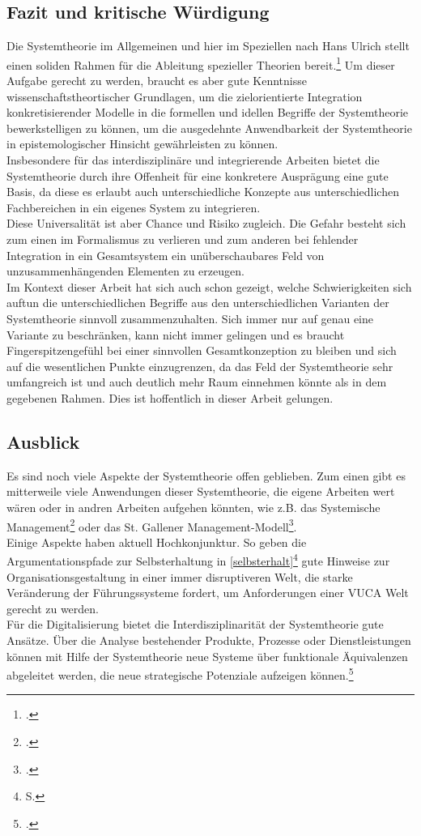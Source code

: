 \documentclass[a4paper,12pt]{article}
\begin{document}
\subsection{Fazit und kritische Würdigung}
Die Systemtheorie im Allgemeinen und hier im Speziellen nach Hans Ulrich stellt einen soliden Rahmen für die Ableitung spezieller Theorien bereit.\footcite[S. 24]{Oelsnitz1994} Um dieser Aufgabe gerecht zu werden, braucht es aber gute Kenntnisse wissenschaftstheortischer Grundlagen, um die zielorientierte Integration konkretisierender Modelle in die formellen und idellen Begriffe der Systemtheorie bewerkstelligen zu können, um die ausgedehnte Anwendbarkeit der Systemtheorie in epistemologischer Hinsicht gewährleisten zu können.\\
Insbesondere für das interdisziplinäre und integrierende Arbeiten bietet die Systemtheorie durch ihre Offenheit für eine konkretere Ausprägung eine gute Basis, da diese es erlaubt auch unterschiedliche Konzepte aus unterschiedlichen Fachbereichen in ein eigenes System zu integrieren.\\
Diese Universalität ist aber Chance und Risiko zugleich. Die Gefahr besteht sich zum einen im Formalismus zu verlieren und zum anderen bei fehlender Integration in ein Gesamtsystem ein unüberschaubares Feld von unzusammenhängenden Elementen zu erzeugen.\\
Im Kontext dieser Arbeit hat sich auch schon gezeigt, welche Schwierigkeiten sich auftun die unterschiedlichen Begriffe aus den unterschiedlichen Varianten der Systemtheorie sinnvoll zusammenzuhalten. Sich immer nur auf genau eine Variante zu beschränken, kann nicht immer gelingen und es braucht Fingerspitzengefühl bei einer sinnvollen Gesamtkonzeption zu bleiben und sich auf die wesentlichen Punkte einzugrenzen, da das Feld der Systemtheorie sehr umfangreich ist und auch deutlich mehr Raum einnehmen könnte als in dem gegebenen Rahmen. Dies ist hoffentlich in dieser Arbeit gelungen.

\subsection{Ausblick}
Es sind noch viele Aspekte der Systemtheorie offen geblieben. Zum einen gibt es mitterweile viele Anwendungen dieser Systemtheorie, die eigene Arbeiten wert wären oder in andren Arbeiten aufgehen könnten, wie z.B. das Systemische Management\footcite{Malik2009} oder das St. Gallener Management-Modell\footcite{RueeggStuerm2020}.\\
Einige Aspekte haben aktuell Hochkonjunktur. So geben die Argumentationspfade zur Selbsterhaltung in \ref{selbsterhalt}\footnote{S. \pageref{selbsterhalt}} gute Hinweise zur Organisationsgestaltung in einer immer disruptiveren Welt, die starke Veränderung der Führungssysteme fordert, um Anforderungen einer VUCA Welt gerecht zu werden.\\
Für die Digitalisierung bietet die Interdisziplinarität der Systemtheorie gute Ansätze. Über die Analyse bestehender Produkte, Prozesse oder Dienstleistungen können mit Hilfe der Systemtheorie neue Systeme über funktionale Äquivalenzen abgeleitet werden, die neue strategische Potenziale aufzeigen können.\footcite[S. 65]{Hartmann2018}


\newpage


\printbibliography
% 
% 
\end{document}
